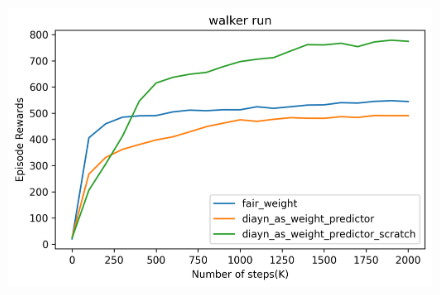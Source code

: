 

\begin{figure}[ht]
  \vskip 0.2in
  \begin{center}
  \centerline{\includegraphics[width=\columnwidth]{Figures/fair_weight_and_diayn_as_weight_predictor}}
  \caption{}
  \label{diayn-as-skill-weight}
  \end{center}
  \vskip -0.2in
  \end{figure}



